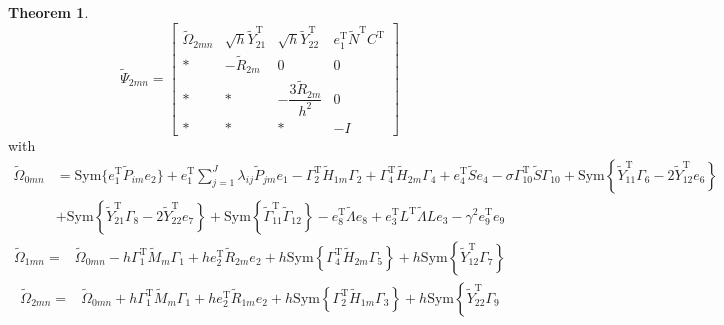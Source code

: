 \documentclass[preprint,review,fleqn,sort&compress,3p]{elsarticle}
\theoremstyle{definition} %
\theoremstyle{definition}%
\newtheorem{thm}{Theorem}[section]
\begin{document}
\begin{thm}
		\begin{equation}\label{LMI2_not}
			\widetilde{\Psi}_{2mn} =
			\begin{bmatrix}
				\widetilde{\Omega}_{2mn} & \sqrt{h} \widetilde{Y}_{21}^{\mathrm{T}} & \sqrt{h} \widetilde{Y}_{22}^{\mathrm{T}} & e_1^{\mathrm{T}} \widetilde{N}^{\mathrm{T}}C^{\mathrm{T}} \\[1.5ex]
				* & -\widetilde{R}_{2m} & 0 & 0 \\[1.5ex]
				* & * & -\dfrac{3\widetilde{R}_{2m}}{h^2} & 0  \\[1.5ex]
				* & * & * & -I 
			\end{bmatrix}
		\end{equation}
		with
		\begin{align*}
			\widetilde{\Omega}_{0mn} &=  \mathrm{Sym} \{e_1^{\mathrm{T}} \widetilde{P}_{im} e_2\}
			+e_1^{\mathrm{T}}  \sum_{j=1}^J {\lambda}_{ij}\widetilde{P}_{jm} e_1
			-\Gamma_{2}^{\mathrm{T}} \widetilde{H}_{1m} \Gamma_{2}
			+\Gamma_{4}^{\mathrm{T}} \widetilde{H}_{2m} \Gamma_{4}
			+e_{4}^{\mathrm{T}} \widetilde{S} e_{4}
			-\sigma \Gamma_{10}^{\mathrm{T}} \widetilde{S} \Gamma_{10}
			+ \mathrm{Sym} \left\{ \widetilde{Y}_{11}^{\mathrm{T}}\Gamma_{6}  -2\widetilde{Y}_{12}^{\mathrm{T}}e_6
			\right\} \\
			&+\mathrm{Sym} \left\{ \widetilde{Y}_{21}^{\mathrm{T}}\Gamma_{8} - 2\widetilde{Y}_{22}^{\mathrm{T}}e_7  \right\}
			+\mathrm{Sym} \left\{ 
			\widetilde{\Gamma}_{11}^{\mathrm{T}} \widetilde{\Gamma}_{12}
			\right\}
			-e_{8}^{\mathrm{T}}  \widetilde{\Lambda} e_{8} 
			+e_{3}^{\mathrm{T}} L^{\mathrm{T}}  \widetilde{\Lambda}  L e_{3} 
			-\gamma^2 e_{9}^{\mathrm{T}}e_{9}
		\end{align*}
		\begin{align*}
			\widetilde{\Omega}_{1mn} = &  \widetilde{\Omega}_{0mn}
			-h \Gamma_{1}^{\mathrm{T}}\widetilde{M}_{m}
			\Gamma_{1}
			+ h e_{2}^{\mathrm{T}} \widetilde{R}_{2m} e_{2}
			+h \mathrm{Sym} \left\{
			\Gamma_{4}^{\mathrm{T}} \widetilde{H}_{2m} \Gamma_{5}
			\right\}
			+h \mathrm{Sym} \left\{ 
			\widetilde{Y}_{12}^{\mathrm{T}}\Gamma_{7}
			\right\}
		\end{align*}
		\begin{align*}
			\widetilde{\Omega}_{2mn} = &\widetilde{\Omega}_{0mn} 
			+h \Gamma_{1}^{\mathrm{T}}\widetilde{M}_{m}
			\Gamma_{1}
			+he_{2}^{\mathrm{T}} \widetilde{R}_{1m} e_{2}
			+h \mathrm{Sym} \left\{
			\Gamma_{2}^{\mathrm{T}} \widetilde{H}_{1m} \Gamma_{3}
			\right\}
			+h \mathrm{Sym} \left\{ 
			\widetilde{Y}_{22}^{\mathrm{T}}\Gamma_{9}

\end{align*}
\end{thm}
\end{document}
